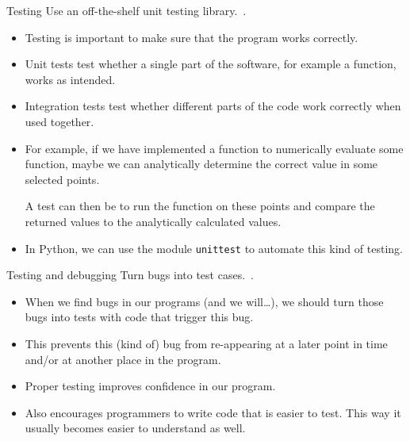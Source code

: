 \documentclass[english]{beamer}
\begin{document}

\begin{frame}{\insertsection}{Testing}
  \vspace{-2mm}
  Use an off-the-shelf unit testing library.~\cite{Wilson2013}.
  \begin{itemize}
  \item Testing is important to make sure that the program works
    correctly.
  \item Unit tests test whether a single part of the software, for
    example a function, works as intended.
  \item Integration tests test whether different parts of the code
    work correctly when used together.
  \item For example, if we have implemented a function to numerically
    evaluate some function, maybe we can analytically determine the
    correct value in some selected points.

    A test can then be to run the function on these points and compare
    the returned values to the analytically calculated values.
  \item In Python, we can use the module \texttt{unittest} to automate
    this kind of testing.
  \end{itemize}
\end{frame}


\begin{frame}{\insertsection}{Testing and debugging}
  Turn bugs into test cases.~\cite{Wilson2013}.
  \begin{itemize}
  \item When we find bugs in our programs (and we will\ldots), we
    should turn those bugs into tests with code that trigger this bug.
  \item This prevents this (kind of) bug from re-appearing at a later
    point in time and/or at another place in the program.
  \item Proper testing improves confidence in our program.
  \item Also encourages programmers to write code that is easier to
    test. This way it usually becomes easier to understand as well.
  \end{itemize}
\end{frame}

\end{document}
